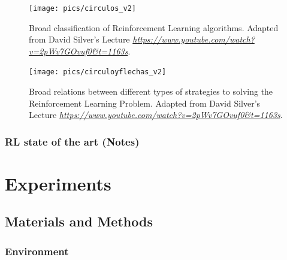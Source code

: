 \documentclass[
  openany]{book}
\begin{document}
\begin{figure}

{\centering \texttt{[image: pics/circulos\_v2]} 

}

\caption{Broad classification of Reinforcement Learning algorithms. Adapted from David Silver's Lecture \emph{\url{https://www.youtube.com/watch?v=2pWv7GOvuf0\&t=1163s}}.}\label{fig:rl-algorithm-type}
\end{figure}



\begin{figure}

{\centering \texttt{[image: pics/circuloyflechas\_v2]} 

}

\caption{Broad relations between different types of strategies to solving the Reinforcement Learning Problem. Adapted from David Silver's Lecture \emph{\url{https://www.youtube.com/watch?v=2pWv7GOvuf0\&t=1163s}}.}\label{fig:rl-relations}
\end{figure}

\hypertarget{rl-state-of-the-art-notes}{%
\subsection{RL state of the art (Notes)}\label{rl-state-of-the-art-notes}}

\hypertarget{experiments}{%
\chapter{Experiments}\label{experiments}}

\hypertarget{materials-and-methods}{%
\section{Materials and Methods}\label{materials-and-methods}}

\hypertarget{environment}{%
\subsection{Environment}\label{environment}}
\end{document}
